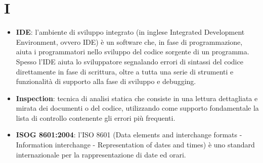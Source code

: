 \section{I}
\begin{itemize} 
	\item
	\textbf{IDE}: l’ambiente di sviluppo integrato (in inglese Integrated Development Environment, ovvero IDE) è un software che, in fase di programmazione, aiuta i programmatori nello sviluppo del codice sorgente di un programma. Spesso l’IDE aiuta lo sviluppatore segnalando errori di sintassi del codice direttamente in fase di scrittura, oltre a tutta una serie di strumenti e funzionalità di supporto alla fase di sviluppo e debugging.
	\item
	\textbf{Inspection}: tecnica di analisi statica che consiste in una lettura dettagliata e mirata dei documenti o del codice, utilizzando come supporto fondamentale la lista di controllo contenente gli errori più frequenti.
	\item
	\textbf{ISOG 8601:2004}: l'ISO 8601 (Data elements and interchange formats - Information interchange - Representation of dates and times) è uno standard internazionale per la rappresentazione di date ed orari.
\end{itemize}